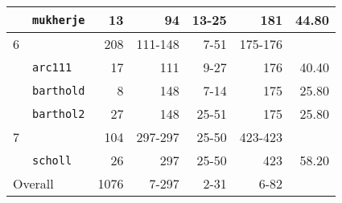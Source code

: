 \begin{table}[tpb]
\begin{tabular}{llrrrrr}
		  & {\tt mukherje} & 13 & 94 & 13-25 & 181 & 44.80 \\\midrule
		6 &  & 208 & 111-148 & 7-51 & 175-176 &  \\
		  & {\tt arc111} & 17 & 111 & 9-27 & 176 & 40.40 \\
		  & {\tt barthold} & 8 & 148 & 7-14 & 175 & 25.80 \\
		  & {\tt barthol2} & 27 & 148 & 25-51 & 175 & 25.80 \\\midrule
		7 &  & 104 & 297-297 & 25-50 & 423-423 &  \\
		  & {\tt scholl} & 26 & 297 & 25-50 & 423 & 58.20 \\\midrule
		\multicolumn{2}{l}{Overall} & 1076 & 7-297 & 2-31 & 6-82 & \\
		\bottomrule
	\end{tabular}
	\label{tab:appen:dataSBF2}
\end{table}

